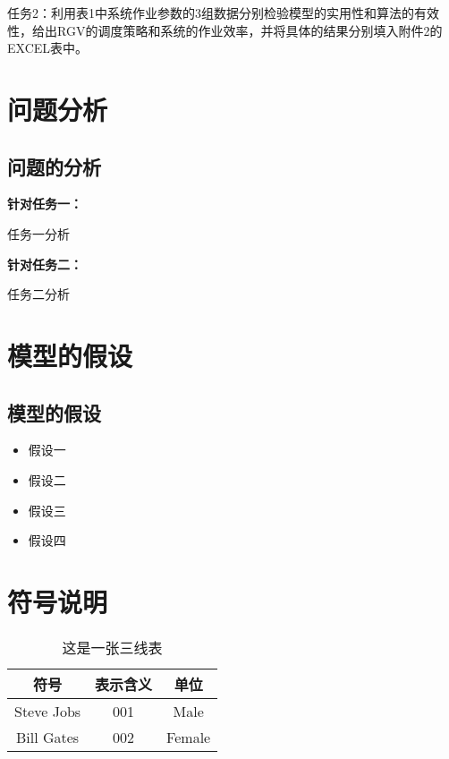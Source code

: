 \documentclass[withoutpreface,bwprint]{cumcmthesis} %
\begin{document}
任务2：利用表1中系统作业参数的3组数据分别检验模型的实用性和算法的有效性，给出RGV的调度策略和系统的作业效率，并将具体的结果分别填入附件2的EXCEL表中。

\section{问题分析}

\subsection{问题的分析}

\textbf{针对任务一：}

任务一分析

\textbf{针对任务二：}

任务二分析

\section{模型的假设}


\subsection{模型的假设}

\begin{itemize}
\item 假设一
\item 假设二
\item 假设三
\item 假设四
\end{itemize}

\section{符号说明}
\begin{center}
\begin{table}[!htbp]
\centering
\caption{这是一张三线表}\label{tab:aStrangeTable}\centering%
\begin{tabular}{c|c|c}\hline
符号& 表示含义& 单位\\\hline
Steve Jobs& 001& Male\\
Bill Gates& 002& Female\\\hline
\end{tabular}
\end{table}
\end{center}
\end{document}
